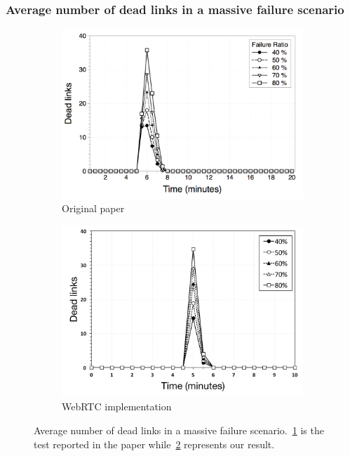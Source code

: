\documentclass{beamer}
\begin{document}
\begin{frame}
\frametitle{Average number of dead links in a massive failure scenario}
    
\begin{figure}
\centering
\begin{subfigure}{.5\textwidth}
  \centering
  \includegraphics[keepaspectratio=true, width=1\linewidth]{images/paper_average_dead_links}
  \caption{Original paper}
  \label{fig:paper_average_dead_links}
\end{subfigure}%
\begin{subfigure}{.5\textwidth}
  \centering
  \includegraphics[keepaspectratio=true, width=1\linewidth]{images/average_dead_links}
  \caption{WebRTC implementation}
  \label{fig:average_dead_links}
\end{subfigure}
\caption{Average number of dead links in a massive failure scenario.~\ref{fig:paper_average_dead_links} is the test reported in the paper while~\ref{fig:average_dead_links} represents our result.}
\label{fig:robustness_dead_links_failures}
\end{figure}

\end{frame}
\end{document}
